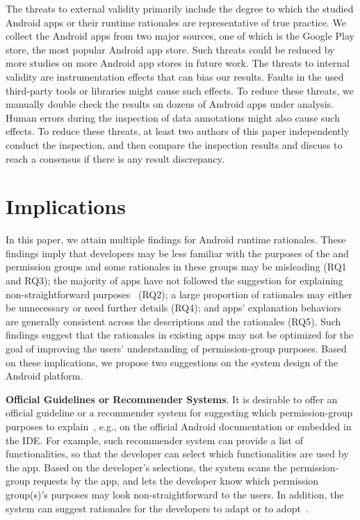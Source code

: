 The threats to external validity primarily include the degree to which the studied Android apps or their runtime rationales are representative of true practice.
We collect the Android apps from two major sources, one of which is the Google Play store, the most popular Android app store. 
Such threats could
be reduced by more studies on more Android app stores in future work. 
%
The threats to internal validity are
instrumentation effects that can bias our results. Faults in
the used third-party tools or libraries  might cause such effects. To reduce these
threats, we manually double check the results on 
dozens of Android apps under analysis. Human errors during the inspection of data annotations might also cause such effects. To reduce these threats, at least two authors of this paper independently conduct the inspection, and then compare the inspection results and discuss to reach a consensus if there is any result discrepancy. 



\section{Implications}
\label{sec:discussion}

In this paper, we attain multiple findings for Android runtime rationales. These findings imply that  developers may be less familiar with the purposes of the  and  permission groups and some rationales in these groups may be misleading (RQ1 and RQ3); the majority of apps have not followed the suggestion for explaining non-straightforward purposes~\cite{shouldshow} (RQ2); a large proportion of rationales may either be unnecessary or need further details (RQ4); and apps' explanation behaviors are generally consistent across the descriptions and the rationales (RQ5). Such findings suggest that the rationales in existing apps may not be optimized for the goal of improving the users' understanding of permission-group purposes. Based on these implications, we propose two suggestions on the system design of the Android platform.  

\textbf{Official Guidelines or Recommender Systems}. 
It is desirable to offer an official guideline or a recommender system for suggesting which permission-group purposes to explain~\cite{clap}, e.g., on the official Android documentation or embedded in the IDE. 
For example, such recommender system can provide a list of functionalities, so that the developer can select which functionalities are used by the app. 
Based on the developer's selections, the system scans the permission-group requests by the app, and lets the developer know which permission group(s)'s purposes may look non-straightforward to the users. 
In addition, the system can suggest rationales for the developers to adapt or to adopt~\cite{clap}. 

